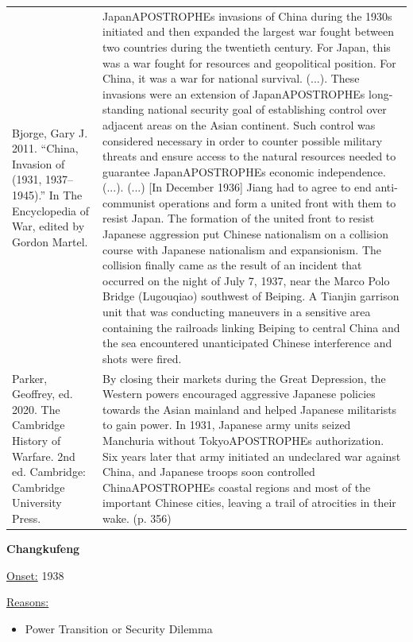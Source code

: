 {\begin{longtable}{p{}p{}}
\\
Bjorge, Gary J. 2011. “China, Invasion of (1931, 1937–1945).” In The Encyclopedia of War, edited by Gordon Martel. & JapanAPOSTROPHEs invasions of China during the 1930s initiated and then expanded the largest war fought between two countries during the twentieth century. For Japan, this was a war fought for resources and geopolitical position. For China, it was a war for national survival. (...). These invasions were an extension of JapanAPOSTROPHEs long-standing national security goal of establishing control over adjacent areas on the Asian continent. Such control was considered necessary in order to counter possible military threats and ensure access to the natural resources needed to guarantee JapanAPOSTROPHEs economic independence. (...).
(...) [In December 1936] Jiang had to agree to end anti-communist operations and form a united front with them to resist Japan. The formation of the united front to resist Japanese aggression put Chinese nationalism on a collision course with Japanese nationalism and expansionism. The collision finally came as the result of an incident that occurred on the night of July 7, 1937, near the Marco Polo Bridge (Lugouqiao) southwest of Beiping. A Tianjin garrison unit that was conducting maneuvers in a sensitive area containing the railroads linking Beiping to central China and the sea encountered unanticipated Chinese interference and shots were fired.
\\
Parker, Geoffrey, ed. 2020. The Cambridge History of Warfare. 2nd ed. Cambridge: Cambridge University Press. & By closing their markets during the Great Depression, the Western powers encouraged aggressive Japanese policies towards the Asian mainland and helped Japanese militarists to gain power. In 1931, Japanese army units seized Manchuria without TokyoAPOSTROPHEs authorization. Six years later that army initiated an undeclared war against China, and Japanese troops soon controlled ChinaAPOSTROPHEs coastal regions and most of the important Chinese cities, leaving a trail of atrocities in their wake.  (p. 356)
\\
\end{longtable}}
\clearpage
         \textbf{Changkufeng} 

          \underline{Onset:} 1938         

\underline{Reasons:}
\begin{itemize}
\item Power Transition or Security Dilemma
\end{itemize}

